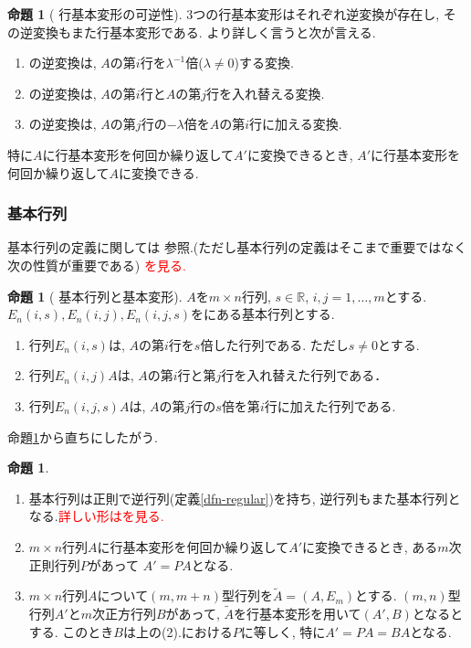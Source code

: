 \documentclass[dvipdfmx,a4paper,11pt]{article} %
\newcommand{\R}{\mathbb{R}}
\newcommand{\xr}[1]{\textcolor{red}{#1}}
\theoremstyle{definition}
\newtheorem{prop}[thm]{命題}
\begin{document}
   \begin{prop}[{\cite[命題2.2.3]{O} 行基本変形の可逆性}]
    \label{thm-inv-basic}
3つの行基本変形はそれぞれ逆変換が存在し, その逆変換もまた行基本変形である. 
より詳しく言うと次が言える. 
 \begin{enumerate}
   \setlength{\parskip}{0cm} 
  \setlength{\itemsep}{0cm}
  \item[(I)] の逆変換は, $A$の第$i$行を$\lambda^{-1}$倍($\lambda\neq 0$)する変換.
 \item[(II)] の逆変換は, $A$の第$i$行と$A$の第$j$行を入れ替える変換.
 \item[(III)]の逆変換は, $A$の第$j$行の$-\lambda$倍を$A$の第$i$行に加える変換.
 \end{enumerate}
 

特に$A$に行基本変形を何回か繰り返して$A'$に変換できるとき, $A'$に行基本変形を何回か繰り返して$A$に変換できる. 
  \end{prop}

  \subsubsection{基本行列}
  
 基本行列の定義に関しては \cite[定義 2.2.4]{O}参照.(ただし基本行列の定義はそこまで重要ではなく次の性質が重要である)
 \xr{\cite[定義 2.2.4]{O}を見る.}
 
 

 \begin{prop}[{\cite[命題 2.2.6]{O} 基本行列と基本変形}]
    \label{thm-basic}
    $A$を$m \times n$行列, $s\in \R$, $i,j = 1, \ldots, m$とする.  
  $E_n(i, s), E_{n}(i,j), E_n(i, j,s)$を\cite[定義 2.2.4]{O}にある基本行列とする. 
  
 \begin{enumerate}
   \setlength{\parskip}{0cm} 
  \setlength{\itemsep}{0cm}
  \item[(I)] 行列$E_n(i, s)$は, $A$の第$i$行を$s$倍した行列である. ただし$s \neq 0$とする. 
    \item[(II)] 行列$E_{n}(i,j)A$は, $A$の第$i$行と第$j$行を入れ替えた行列である． 
      \item[(III)] 行列$E_{n}(i,j, s)A$は, $A$の第$j$行の$s$倍を第$i$行に加えた行列である.  \end{enumerate} 
  \end{prop}
  命題\ref{thm-inv-basic}から直ちにしたがう.
\begin{prop}
\begin{enumerate}
\item \cite[命題 2.2.7]{O}
基本行列は正則で逆行列(定義\ref{dfn-regular})を持ち, 逆行列もまた基本行列となる.\xr{詳しい形は\cite[命題 2.2.7]{O}を見る.}
\item \cite[命題 2.2.8]{O}
$m \times n$行列$A$に行基本変形を何回か繰り返して$A'$に変換できるとき, ある$m$次正則行列$P$があって
$A'=PA$となる. 
\item \cite[命題 2.2.9]{O}$m \times n$行列$A$について$(m, m+n)$型行列を$\widetilde{A}=(A , E_m)$とする. $(m, n)$型行列$A'$と$m$次正方行列$B$があって, $\widetilde{A}$を行基本変形を用いて$(A', B)$となるとする. このとき$B$は上の(2).における$P$に等しく, 特に$A'=PA=BA$となる. 
\end{enumerate}
  \end{prop}
 
\end{document}
